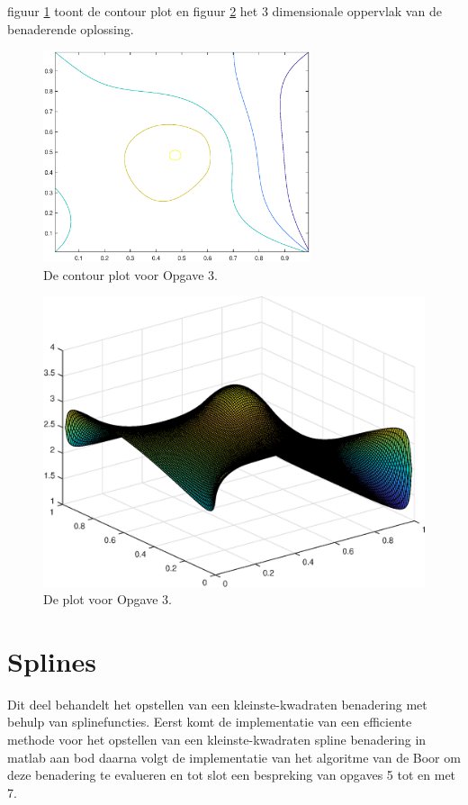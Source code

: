 \documentclass[a4paper]{article}
\begin{document}
figuur \ref{fig:Contour3} toont de contour plot en figuur \ref{fig:Plot3} het 3 dimensionale oppervlak van de benaderende oplossing.
\newpage
\begin{figure}[H]
	\begin{center} 
		\includegraphics[width=0.7\textwidth]{Contour3.eps}
	\end{center}
	\caption{De contour plot voor Opgave 3.}
	\label{fig:Contour3}
\end{figure}

\begin{figure}[H]
	\begin{center} 
		\includegraphics[width=1\textwidth]{Plot3.eps}
	\end{center}
	\caption{De plot voor Opgave 3.}
	\label{fig:Plot3}
\end{figure}
\newpage

\section{Splines}\label{sec:splines}
Dit deel behandelt het opstellen van een kleinste-kwadraten benadering met behulp van splinefuncties. Eerst komt de implementatie van een efficiente methode voor het opstellen van een kleinste-kwadraten spline benadering in matlab aan bod daarna volgt de implementatie van het algoritme van de Boor om deze benadering te evalueren en tot slot een bespreking van opgaves 5 tot en met 7.
\end{document}
